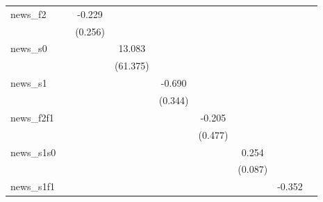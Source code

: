 {\begin{tabular}{l*{8}{c}}
\addlinespace
news\_f2     &                     &      -0.229         &                     &                     &                     &                     &                     &                     \\
            &                     &     (0.256)         &                     &                     &                     &                     &                     &                     \\
\addlinespace
news\_s0     &                     &                     &      13.083         &                     &                     &                     &                     &                     \\
            &                     &                     &    (61.375)         &                     &                     &                     &                     &                     \\
\addlinespace
news\_s1     &                     &                     &                     &      -0.690\sym{**} &                     &                     &                     &                     \\
            &                     &                     &                     &     (0.344)         &                     &                     &                     &                     \\
\addlinespace
news\_f2f1   &                     &                     &                     &                     &      -0.205         &                     &                     &                     \\
            &                     &                     &                     &                     &     (0.477)         &                     &                     &                     \\
\addlinespace
news\_s1s0   &                     &                     &                     &                     &                     &       0.254\sym{***}&                     &                     \\
            &                     &                     &                     &                     &                     &     (0.087)         &                     &                     \\
\addlinespace
news\_s1f1   &                     &                     &                     &                     &                     &                     &      -0.352         &                     \\

\end{tabular}}
